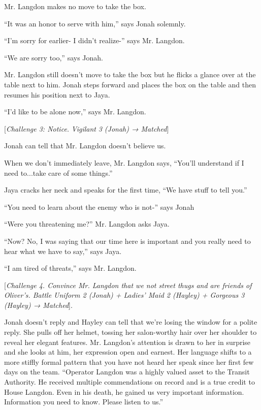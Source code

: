 Mr. Langdon makes no move to take the box.

``It was an honor to serve with him,'' says Jonah solemnly.

``I'm sorry for earlier- I didn't realize-'' says Mr. Langdon.

``We are sorry too,'' says Jonah.

Mr. Langdon still doesn't move to take the box but he flicks a glance over at the table next to him.  Jonah steps forward and places the box on the table and then resumes his position next to Jaya.

``I'd like to be alone now,'' says Mr. Langdon.

{[}\textit{Challenge 3: Notice. }\textit{Vigilant }\textit{3 (Jonah) → Matched}{]} 

Jonah can tell that Mr. Langdon doesn't believe us.

When we don't immediately leave, Mr. Langdon says, ``You'll understand if I need to...take care of some things.''

Jaya cracks her neck and speaks for the first time, ``We have stuff to tell you.''

``You need to learn about the enemy who is not-'' says Jonah

``Were you threatening me?'' Mr. Langdon asks Jaya.

``Now?  No, I was saying that our time here is important and you really need to hear what we have to say,'' says Jaya.

``I am tired of threats,'' says Mr. Langdon.

{[}\textit{Challenge 4.  Convince Mr. Langdon that we not street thugs and are friends of Oliver's.  Battle Uniform 2 (Jonah) + Ladies' Maid 2 (Hayley) + Gorgeous 3 (Hayley)  → Matched}{]}. 

Jonah doesn't reply and Hayley can tell that we're losing the window for a polite reply.  She pulls off her helmet, tossing her salon-worthy hair over her shoulder to reveal her elegant features.  Mr. Langdon's attention is drawn to her in surprise and she looks at him, her expression open and earnest.  Her language shifts to a more stiffly formal pattern that you have not heard her speak since her first few days on the team.  ``Operator Langdon was a highly valued asset to the Transit Authority.  He received multiple commendations on record and is a true credit to House Langdon.  Even in his death, he gained us very important information.  Information you need to know.  Please listen to us.''





